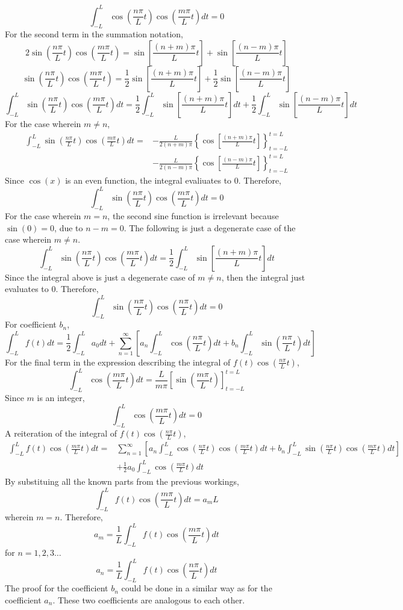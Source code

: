 \documentclass[a4paper, 12pt]{report}
\def\f{\frac}
\def\l{\left}
\def\r{\right}
\def\dst{\displaystyle}
\begin{document}
\begin{center}
$$\int_{-L}^{L}\cos\l(\f{n\pi}{L}t\r)\cos\l(\f{m\pi}{L}t\r)dt = 0$$
For the second term in the summation notation,
$$2\sin\l(\f{n\pi}{L}t\r)\cos\l(\f{m\pi}{L}t\r) = \sin\l[\f{(n+m)\pi}{L}t\r] + \sin\l[\f{(n-m)\pi}{L}t\r]$$
$$\sin\l(\f{n\pi}{L}t\r)\cos\l(\f{m\pi}{L}t\r) = \f{1}{2}\sin\l[\f{(n+m)\pi}{L}t\r] + \f{1}{2}\sin\l[\f{(n-m)\pi}{L}t\r]$$
$$\int_{-L}^{L}\sin\l(\f{n\pi}{L}t\r)\cos\l(\f{m\pi}{L}t\r)dt = \f{1}{2}\int_{-L}^{L}\sin\l[\f{(n+m)\pi}{L}t\r]dt + \f{1}{2}\int_{-L}^{L}\sin\l[\f{(n-m)\pi}{L}t\r]dt$$
For the case wherein $m\neq n$,
\begin{align*}
\int_{-L}^{L}\sin\l(\f{n\pi}{L}t\r)\cos\l(\f{m\pi}{L}t\r)dt = &-\f{L}{2(n+m)\pi}\l\{\cos\l[\f{(n+m)\pi}{L}t\r]\r\}_{t = -L}^{t = L} \\ & - \f{L}{2(n-m)\pi}\l\{\cos\l[\f{(n-m)\pi}{L}t\r]\r\}_{t = -L}^{t = L}
\end{align*}
Since $\cos(x)$ is an even function, the integral evaliuates to 0. Therefore,
$$\int_{-L}^{L}\sin\l(\f{n\pi}{L}t\r)\cos\l(\f{m\pi}{L}t\r)dt = 0$$
For the case wherein $m = n$, the second sine function is irrelevant because $\sin(0) = 0$, due to $n-m=0$. The following is just a degenerate case of the case wherein $m\neq n$.
$$\int_{-L}^{L}\sin\l(\f{n\pi}{L}t\r)\cos\l(\f{m\pi}{L}t\r)dt = \f{1}{2}\int_{-L}^{L}\sin\l[\f{(n+m)\pi}{L}t\r]dt$$
Since the integral above is just a degenerate case of $m\neq n$, then the integral just evaluates to $0$. Therefore,
$$\int_{-L}^{L}\sin\l(\f{n\pi}{L}t\r)\cos\l(\f{n\pi}{L}t\r)dt = 0$$
For coefficient $b_n$,
$$\int_{-L}^{L}f(t)dt = \f{1}{2} \int_{-L}^{L}a_0dt + \sum_{n = 1}^{\infty}\l[a_n \int_{-L}^{L}\cos\l(\f{n\pi}{L}t\r)dt + b_n \int_{-L}^{L}\sin\l(\f{n\pi}{L}t\r)dt\r]$$
For the final term in the expression describing the integral of $\dst{f(t)\cos\l(\f{n\pi}{L}t\r)}$, 
$$\int_{-L}^{L}\cos\l(\f{m\pi}{L}t\r)dt = \f{L}{m\pi}\l[\sin\l(\f{m\pi}{L}t\r)\r]^{t=L}_{t=-L}$$
Since $m$ is an integer,
$$\int_{-L}^{L}\cos\l(\f{m\pi}{L}t\r)dt = 0$$
A reiteration of the integral of $\dst{f(t)\cos\l(\f{n\pi}{L}t\r)}$,
 \begin{align*}
\int_{-L}^{L}f(t)\cos\l(\f{m\pi}{L}t\r)dt = &\sum_{n = 1}^{\infty}\l[a_n \int_{-L}^{L}\cos\l(\f{n\pi}{L}t\r)\cos\l(\f{m\pi}{L}t\r)dt + b_n \int_{-L}^{L}\sin\l(\f{n\pi}{L}t\r)\cos\l(\f{m\pi}{L}t\r)dt\r] \\ &+ \f{1}{2}a_0 \int_{-L}^{L}\cos\l(\f{m\pi}{L}t\r)dt
\end{align*}
By substituing all the known parts from the previous workings, 
$$\int_{-L}^{L}f(t)\cos\l(\f{m\pi}{L}t\r)dt = a_m L$$
wherein $m = n$. Therefore,
$$a_m = \f{1}{L}\int_{-L}^{L}f(t)\cos\l(\f{m\pi}{L}t\r)dt$$
for $n=1,2,3\dots$
$$a_n = \f{1}{L}\int_{-L}^{L}f(t)\cos\l(\f{n\pi}{L}t\r)dt$$
The proof for the coefficient $b_n$ could be done in a similar way as for the coefficient $a_n$. These two coefficients are analogous to each other.

\end{center}
\end{document}
